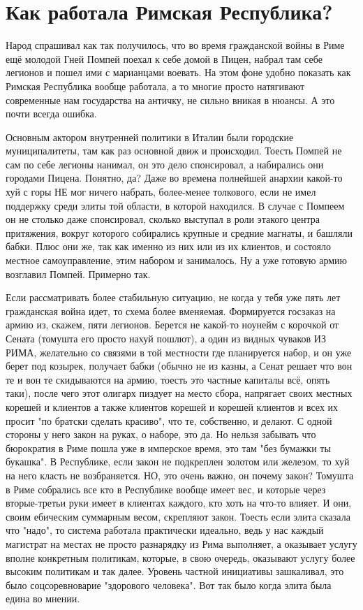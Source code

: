\chapter{Как работала Римская Республика? }



Народ спрашивал как так получилось, что во время гражданской войны в Риме ещё молодой Гней Помпей поехал к себе домой в Пицен, набрал там себе легионов и пошел ими с марианцами воевать. На этом фоне удобно показать как Римская Республика вообще работала, а то многие просто натягивают современные нам государства на античку, не сильно вникая в нюансы. А это почти всегда ошибка.


Основным актором внутренней политики в Италии были городские муниципалитеты, там как раз основной движ и происходил. Тоесть Помпей не сам по себе легионы нанимал, он это дело спонсировал, а набирались они городами Пицена. Понятно, да? Даже во времена полнейшей анархии какой-то хуй с горы НЕ мог ничего набрать, более-менее толкового, если не имел поддержку среди элиты той области, в которой находился. В случае с Помпеем он не столько даже спонсировал, сколько выступал в роли этакого центра притяжения, вокруг которого собирались крупные и средние магнаты, и башляли бабки. Плюс они же, так как именно из них или из их клиентов, и состояло местное самоуправление, этим набором и занималось. Ну а уже готовую армию возглавил Помпей. Примерно так.


Если рассматривать более стабильную ситуацию, не когда у тебя уже пять лет гражданская война идет, то схема более вменяемая. Формируется госзаказ на армию из, скажем, пяти легионов. Берется не какой-то ноунейм с корочкой от Сената (томушта его просто нахуй пошлют), а один из видных чуваков ИЗ РИМА, желательно со связями в той местности где планируется набор, и он уже берет под козырек, получает бабки (обычно не из казны, а Сенат решает что вон те и вон те скидываются на армию, тоесть это частные капиталы всё, опять таки), после чего этот олигарх пиздует на место сбора, напрягает своих местных корешей и клиентов а также клиентов корешей и корешей клиентов и всех их просит "по братски сделать красиво", что те, собственно, и делают. С одной стороны у него закон на руках, о наборе, это да. Но нельзя забывать что бюрократия в Риме пошла уже в имперское время, это там "без бумажки ты букашка". В Республике, если закон не подкреплен золотом или железом, то хуй на него класть не возбраняется. НО, это очень важно, он почему закон? Томушта в Риме собрались все кто в Республике вообще имеет вес, и которые через вторые-третьи руки имеет в клиентах каждого, кто хоть на что-то влияет. И они, своим ебическим суммарным весом, скрепляют закон. Тоесть если элита сказала что "надо", то система работала практически идеально, ведь у нас каждый магистрат на местах не просто разнарядку из Рима выполняет, а оказывает услугу вполне конкретным политикам, которые, в свою очередь, оказывают услугу более высоким политикам и так далее. Уровень частной инициативы зашкаливал, это было соцсоревноварие "здорового человека". Вот так было когда элита была едина во мнении.



